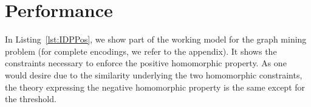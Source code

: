 \section{Performance}\label{sec:performance}

In Listing~\ref{lst:IDPPos}, we show part of the working model for the graph mining problem (for complete encodings, we refer to the appendix).
It shows the constraints necessary to enforce the positive homomorphic property.
As one would desire due to the similarity underlying the two homomorphic constraints, the theory expressing the negative homomorphic property is the same except for the threshold.

